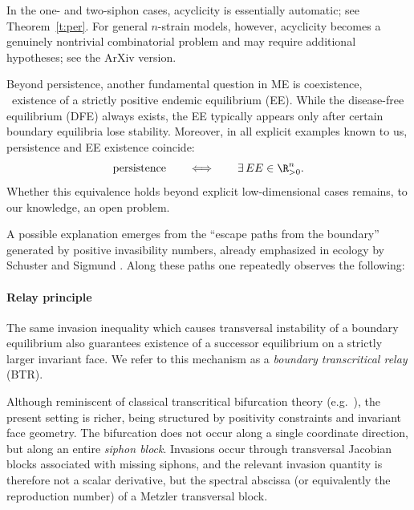 In the one- and two-siphon cases, acyclicity is essentially automatic;
see Theorem~\ref{t:per}.  For general \(n\)-strain models, however,
acyclicity becomes a genuinely nontrivial combinatorial problem and may
require additional hypotheses; see the ArXiv version.


Beyond persistence, another fundamental question in ME is coexistence,
\ie\ existence of a strictly positive endemic equilibrium (EE).
While the disease-free equilibrium (DFE) always exists, the EE typically
appears only after certain boundary equilibria lose stability.
Moreover, in all explicit examples known to us, persistence and EE
existence coincide:
\[
        \text{persistence}
        \qquad\Longleftrightarrow\qquad
        \exists\,EE\in\R^n_{>0}.
\]
Whether this equivalence holds beyond explicit low-dimensional cases
remains, to our knowledge, an  open problem.

A possible explanation emerges from the ``escape paths from the
boundary'' generated by positive invasibility numbers, already emphasized in
ecology by Schuster and Sigmund
\cite{SchusSig,SigSchus}.  Along these paths one repeatedly observes
the following:

\paragraph{Relay principle}
The same invasion inequality which causes transversal instability of a
boundary equilibrium also guarantees existence of a successor equilibrium
on a strictly larger invariant face.  We refer to this mechanism as a
\emph{boundary transcritical relay} (BTR).

Although reminiscent of classical transcritical bifurcation theory
(e.g.\ \cite{Boldin}), the present setting is richer, being structured
by positivity constraints and invariant face geometry.
The bifurcation does not occur along a single coordinate direction, but
along an entire \emph{siphon block}.
Invasions occur through transversal Jacobian
blocks associated with missing siphons, and the relevant invasion quantity
is therefore not a scalar derivative, but the spectral abscissa (or
equivalently the reproduction number) of a Metzler transversal block.

